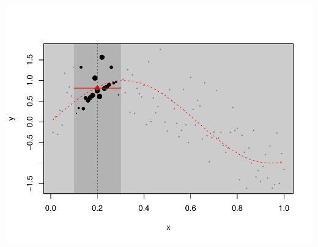 \documentclass[14pt]{extreport}\usepackage[]{graphicx}\usepackage[]{xcolor}
\makeatletter
\def\maxwidth{ %
  \ifdim\Gin@nat@width>\linewidth
    \linewidth
  \else
    \Gin@nat@width
  \fi
}
\newenvironment{knitrout}{}{} %
\makeatother
\begin{document}
\begin{knitrout}
{\centering \includegraphics[width=\maxwidth]{figure/unnamed-chunk-25-1} 

}


\end{knitrout}
\end{document}
